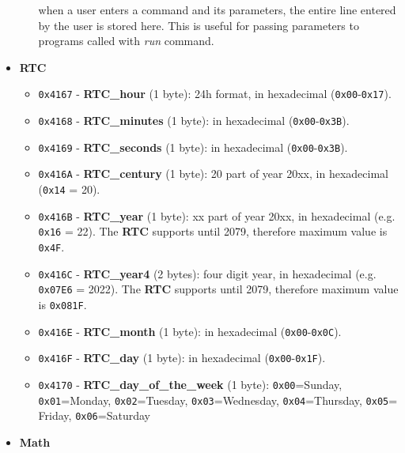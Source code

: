 \begin{itemize}
\begin{itemize}
                when a user enters a command and its parameters, the entire line
                entered by the user is stored here. This is useful for passing
                parameters to programs called with \textit{run} command.
            \end{itemize}
            \item \textbf{RTC}
            \begin{itemize}
                \item \texttt{0x4167} - \textbf{RTC\_hour} (1 byte): 24h format,
                in hexadecimal (\texttt{0x00}-\texttt{0x17}).
                \item \texttt{0x4168} - \textbf{RTC\_minutes} (1 byte): in
                hexadecimal (\texttt{0x00}-\texttt{0x3B}).
                \item \texttt{0x4169} - \textbf{RTC\_seconds} (1 byte): in
                hexadecimal (\texttt{0x00}-\texttt{0x3B}).
                \item \texttt{0x416A} - \textbf{RTC\_century} (1 byte): 20 part of
                year 20xx, in hexadecimal (\texttt{0x14} = 20).
                \item \texttt{0x416B} - \textbf{RTC\_year} (1 byte): xx part of
                year 20xx, in hexadecimal (e.g. \texttt{0x16} = 22). The \textbf{RTC}
                supports until 2079, therefore maximum value is \texttt{0x4F}.
                \item \texttt{0x416C} - \textbf{RTC\_year4} (2 bytes): four digit
                year, in hexadecimal (e.g. \texttt{0x07E6} = 2022). The \textbf{RTC}
                supports until 2079, therefore maximum value is \texttt{0x081F}.
                \item \texttt{0x416E} - \textbf{RTC\_month} (1 byte): in
                hexadecimal (\texttt{0x00}-\texttt{0x0C}).
                \item \texttt{0x416F} - \textbf{RTC\_day} (1 byte): in hexadecimal
                (\texttt{0x00}-\texttt{0x1F}).
                \item \texttt{0x4170} - \textbf{RTC\_day\_of\_the\_week} (1 byte):
                \texttt{0x00}=Sunday, \texttt{0x01}=Monday, \texttt{0x02}=Tuesday,
                \texttt{0x03}=Wednesday, \texttt{0x04}=Thursday, \texttt{0x05}=
                Friday, \texttt{0x06}=Saturday
            \end{itemize}
            \item \textbf{Math}
            \begin{itemize}

\end{itemize}
\end{itemize}
